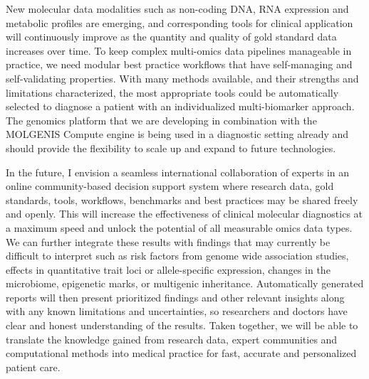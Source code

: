 New molecular data modalities such as non-coding DNA, RNA expression and metabolic profiles are emerging, and corresponding tools for clinical application will continuously improve as the quantity and quality of gold standard data increases over time.
To keep complex multi-omics data pipelines manageable in practice, we need modular best practice workflows that have self-managing and self-validating properties.
With many methods available, and their strengths and limitations characterized, the most appropriate tools could be automatically selected to diagnose a patient with an individualized multi-biomarker approach.
The genomics platform that we are developing in combination with the MOLGENIS Compute engine is being used in a diagnostic setting already and should provide the flexibility to scale up and expand to future technologies.

In the future, I envision a seamless international collaboration of experts in an online community-based decision support system where research data, gold standards, tools, workflows, benchmarks and best practices may be shared freely and openly.
This will increase the effectiveness of clinical molecular diagnostics at a maximum speed and unlock the potential of all measurable omics data types.
We can further integrate these results with findings that may currently be difficult to interpret such as risk factors from genome wide association studies, effects in quantitative trait loci or allele-specific expression, changes in the microbiome, epigenetic marks, or multigenic inheritance.
Automatically generated reports will then present prioritized findings and other relevant insights along with any known limitations and uncertainties, so researchers and doctors have clear and honest understanding of the results.
Taken together, we will be able to translate the knowledge gained from research data, expert communities and computational methods into medical practice for fast, accurate and personalized patient care.
